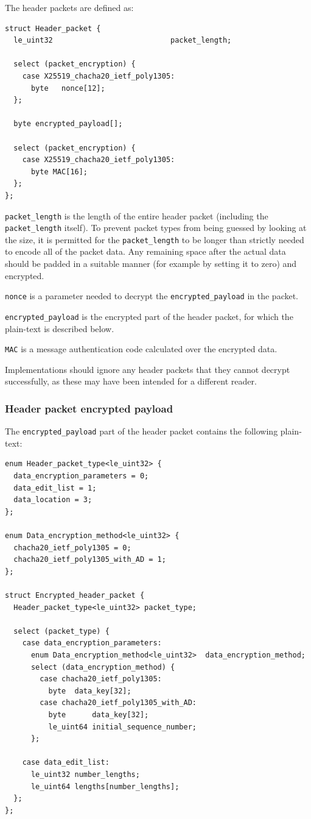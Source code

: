 \documentclass[10pt]{article}
\newcommand{\kw}[1]{\texttt{#1}}
\begin{document}
The header packets are defined as:

\begin{verbatim}
struct Header_packet {
  le_uint32                           packet_length;

  select (packet_encryption) {
    case X25519_chacha20_ietf_poly1305:
      byte   nonce[12];
  };

  byte encrypted_payload[];

  select (packet_encryption) {
    case X25519_chacha20_ietf_poly1305:
      byte MAC[16];
  };
};
\end{verbatim}

\kw{packet\_length} is the length of the entire header packet (including the \kw{packet\_length} itself).
To prevent packet types from being guessed by looking at the size, it is permitted for the \kw{packet\_length} to be
longer than strictly needed to encode all of the packet data.
Any remaining space after the actual data should be padded in a suitable manner (for example by setting it to zero)
and encrypted.

\kw{nonce} is a parameter needed to decrypt the \kw{encrypted\_payload} in the
packet.

\kw{encrypted\_payload} is the encrypted part of the header packet, for which the plain-text is described below.

\kw{MAC} is a message authentication code calculated over the encrypted data.

Implementations should ignore any header packets that they cannot decrypt successfully, as these may have
been intended for a different reader.

\subsubsection{Header packet encrypted payload}

The \kw{encrypted\_payload} part of the header packet contains the following plain-text:

\begin{verbatim}
enum Header_packet_type<le_uint32> {
  data_encryption_parameters = 0;
  data_edit_list = 1;
  data_location = 3;
};

enum Data_encryption_method<le_uint32> {
  chacha20_ietf_poly1305 = 0;
  chacha20_ietf_poly1305_with_AD = 1;
};

struct Encrypted_header_packet {
  Header_packet_type<le_uint32> packet_type;

  select (packet_type) {
    case data_encryption_parameters:
      enum Data_encryption_method<le_uint32>  data_encryption_method;
      select (data_encryption_method) {
        case chacha20_ietf_poly1305:
          byte  data_key[32];
        case chacha20_ietf_poly1305_with_AD:
          byte      data_key[32];
          le_uint64 initial_sequence_number;
      };

    case data_edit_list:
      le_uint32 number_lengths;
      le_uint64 lengths[number_lengths];
  };
};
\end{verbatim}
\end{document}
